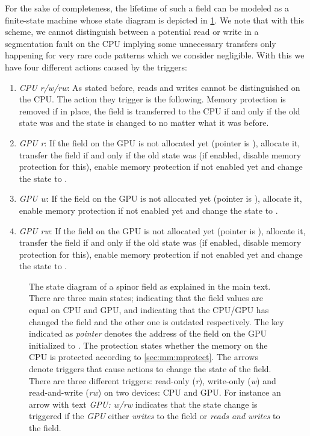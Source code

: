 For the sake of completeness, the lifetime of such a field can be modeled as a finite-state machine whose state diagram is depicted in \cref{fig:mm:fsm}.
We note that with this scheme, we cannot distinguish between a potential read or write in a segmentation fault on the CPU implying some unnecessary transfers only happening for very rare code patterns which we consider negligible.
With this we have four different actions caused by the triggers:
\begin{enumerate}
  \item \emph{CPU r/w/rw}: As stated before, reads and writes cannot be distinguished on the CPU. The action they trigger is the following. Memory protection is removed if in place, the field is transferred to the CPU if and only if the old state was  and the state is changed to  no matter what it was before.
  \item \emph{GPU r}: If the field on the GPU is not allocated yet (pointer is ), allocate it, transfer the field if and only if the old state was  (if enabled, disable memory protection for this), enable memory protection if not enabled yet and change the state to .
  \item \emph{GPU w}: If the field on the GPU is not allocated yet (pointer is ), allocate it, enable memory protection if not enabled yet and change the state to .
  \item \emph{GPU rw}: If the field on the GPU is not allocated yet (pointer is ), allocate it, transfer the field if and only if the old state was  (if enabled, disable memory protection for this), enable memory protection if not enabled yet and change the state to .
\end{enumerate}

\begin{figure}
  
  \caption{The state diagram of a spinor field as explained in the main text. There are three main states;  indicating that the field values are equal on CPU and GPU,  and  indicating that the CPU/GPU has changed the field and the other one is outdated respectively. The key indicated as \emph{pointer} denotes the address of the field on the GPU initialized to . The protection states whether the memory on the CPU is protected according to \cref{sec:mm:mprotect}. The arrows denote triggers that cause actions to change the state of the field. There are three different triggers: read-only (\emph{r}), write-only (\emph{w}) and read-and-write (\emph{rw}) on two devices: CPU and GPU. For instance an arrow with text \emph{GPU: w/rw} indicates that the state change is triggered if the \emph{GPU} either \emph{writes} to the field or \emph{reads and writes} to the field.}
  \label{fig:mm:fsm}
\end{figure}

